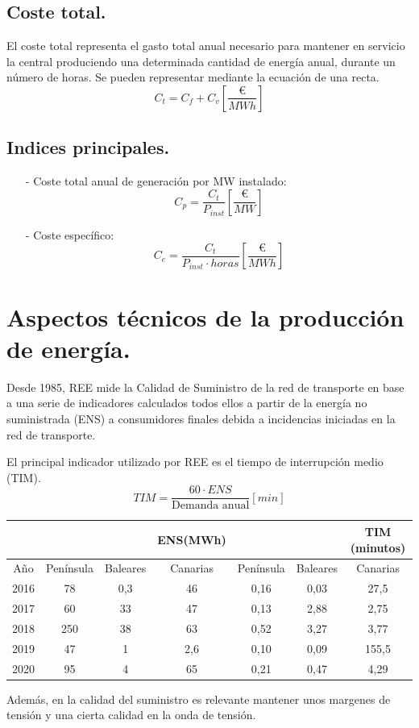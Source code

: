 \subsection{Coste total.}
El coste total representa el gasto total anual necesario para mantener en servicio la central
produciendo una determinada cantidad de energía anual, durante un número de horas. Se pueden representar mediante la ecuación de una recta.
\[C_t=C_f+C_v \left[\frac{\euro}{MWh}\right]\]
\subsection{Indices principales.}
\begin{itemize}
	\item [-] Coste total anual de generación por MW instalado:
	\[C_p=\frac{C_t}{P_{inst}} \left[\frac{\euro}{MW}\right]\]
	\item [-] Coste específico:
	\[C_e=\frac{C_t}{P_{inst}\cdot horas} \left[\frac{\euro}{MWh}\right]\]
\end{itemize}
\section{Aspectos técnicos de la producción de energía.} 
Desde 1985, REE mide la Calidad de Suministro de la red de transporte en base a una serie de indicadores
calculados todos ellos a partir de la energía no suministrada (ENS) a consumidores finales debida a incidencias
iniciadas en la red de transporte.





El principal indicador utilizado por REE es el tiempo de interrupción medio (TIM).
\[TIM = \frac{60\cdot ENS}{\text{Demanda anual}} [min]\]
\begin{table}[H]
	\centering
	\renewcommand{\arraystretch}{1.5}
	\begin{tabular}{cccc|ccc}
		\hline
		 & &&ENS(MWh)&&&TIM (minutos) \\\hline
		Año&Península &Baleares&Canarias&Península &Baleares&Canarias \\\hline
		2016&78  &0,3  &46&0,16&0,03&27,5 \\\hline
		2017&60  &33   &47&0,13&2,88&2,75 \\\hline
		2018&250 &38   &63&0,52&3,27&3,77 \\\hline
		2019&47  &1    &2,6&0,10&0,09&155,5 \\\hline
		2020&95  & 4   &65&0,21&0,47&4,29 \\\hline
	\end{tabular}
\end{table}
Además, en la calidad del suministro es relevante mantener unos margenes de tensión y una cierta calidad en la onda de tensión.
